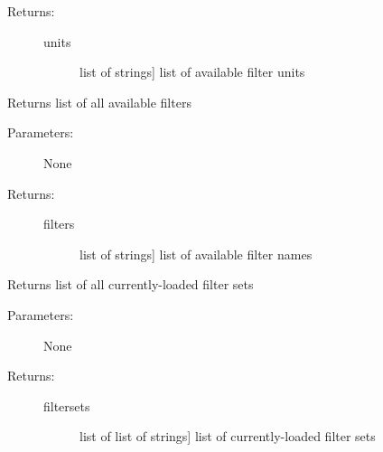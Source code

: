 \documentclass[letterpaper,10pt,english]{sphinxmanual}
\begin{document}
\begin{fulllineitems}
\begin{fulllineitems}
\begin{description}
\item[{Returns:}] \leavevmode\begin{description}
\item[{units}] \leavevmode{[}list of strings{]}
list of available filter units

\end{description}

\end{description}

\end{fulllineitems}


\begin{fulllineitems}
\label{\detokenize{cluster_slug:slugpy.cluster_slug.cluster_slug.filters}}
Returns list of all available filters
\begin{description}
\item[{Parameters:}] \leavevmode
None

\item[{Returns:}] \leavevmode\begin{description}
\item[{filters}] \leavevmode{[}list of strings{]}
list of available filter names

\end{description}

\end{description}

\end{fulllineitems}


\begin{fulllineitems}
\label{\detokenize{cluster_slug:slugpy.cluster_slug.cluster_slug.filtersets}}
Returns list of all currently-loaded filter sets
\begin{description}
\item[{Parameters:}] \leavevmode
None

\item[{Returns:}] \leavevmode\begin{description}
\item[{filtersets}] \leavevmode{[}list of list of strings{]}
list of currently-loaded filter sets

\end{description}


\end{description}
\end{fulllineitems}
\end{fulllineitems}
\end{document}
